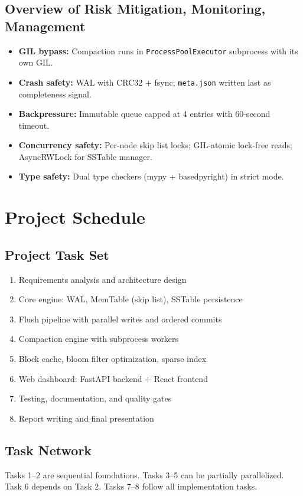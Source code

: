 \documentclass[oneside,a4paper,12pt]{book}
\begin{document}
\subsection{Overview of Risk Mitigation, Monitoring, Management}

\begin{itemize}[leftmargin=2em]
    \item \textbf{GIL bypass:} Compaction runs in \texttt{ProcessPoolExecutor} subprocess with its own GIL.
    \item \textbf{Crash safety:} WAL with CRC32 + fsync; \texttt{meta.json} written last as completeness signal.
    \item \textbf{Backpressure:} Immutable queue capped at 4 entries with 60-second timeout.
    \item \textbf{Concurrency safety:} Per-node skip list locks; GIL-atomic lock-free reads; AsyncRWLock for SSTable manager.
    \item \textbf{Type safety:} Dual type checkers (mypy + basedpyright) in strict mode.
\end{itemize}

\section{Project Schedule}

\subsection{Project Task Set}
\begin{enumerate}[leftmargin=2em]
    \item Requirements analysis and architecture design
    \item Core engine: WAL, MemTable (skip list), SSTable persistence
    \item Flush pipeline with parallel writes and ordered commits
    \item Compaction engine with subprocess workers
    \item Block cache, bloom filter optimization, sparse index
    \item Web dashboard: FastAPI backend + React frontend
    \item Testing, documentation, and quality gates
    \item Report writing and final presentation
\end{enumerate}

\subsection{Task Network}
Tasks 1--2 are sequential foundations. Tasks 3--5 can be partially parallelized. Task 6 depends on Task 2. Tasks 7--8 follow all implementation tasks.
\end{document}
